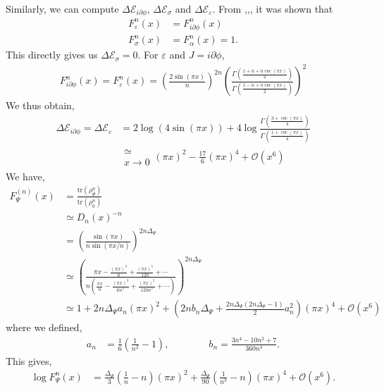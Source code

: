 \documentclass[11pt]{article}
\newcommand{\p}{\partial}
\newcommand{\mO}{\mathcal{O}}
\newcommand{\lb}{\left(}
\newcommand{\rb}{\right)}
\begin{document}
Similarly, we can compute $\Delta \mathcal{E}_{i\p\phi}$, $\Delta \mathcal{E}_{\sigma}$ and $\Delta\mathcal{E}_\varepsilon$. From \cite{Calabrese_2014},\cite{Essler_2013},\cite{Nakagawa_2017}, it was shown that 
\begin{align}
    F_\varepsilon^n(x) &= F_{i\p\phi}^n(x) \\
    F_\sigma^n(x) &= F_\alpha^n(x) = 1.
\end{align}
This directly gives us $\Delta \mathcal{E}_\sigma = 0$. 
For $\varepsilon$ and $J = i\p\phi$, 
\begin{align}
    F_{i\p\phi}^n(x) = F_\varepsilon^n(x) = \lb\frac{2\sin(\pi x)}{n}\rb^{2n} \lb\frac{\Gamma\lb\frac{1+n+n\csc(\pi x)}{2}\rb}{\Gamma\lb\frac{1-n+n\csc(\pi x)}{2}\rb}\rb^2
\end{align}
We thus obtain,
\begin{align}
    \Delta \mathcal{E}_{i\p\phi}= \Delta \mathcal{E}_{\varepsilon} &= 2\log \lb4\sin(\pi x)\rb +4\log \frac{\Gamma\lb\frac{3+\csc(\pi x)}{4}\rb}{\Gamma\lb\frac{1+\csc(\pi x)}{4}\rb} \\
    &\substack{\simeq \\x\to 0} (\pi x)^2 - \frac{17}{6}(\pi x)^4 + \mO(x^6)
\end{align}
We have,
\begin{align}
    F^{(n)}_\Psi(x) &= \frac{\text{tr}(\rho_\Psi^n)}{\text{tr}(\rho_0^n)} \\
    &\simeq D_n(x)^{-n} \\
    &= \lb\frac{\sin(\pi x)}{n\sin(\pi x/n)}\rb^{2n\Delta_\Psi} \\
    &\simeq \lb\frac{\pi x -\frac{(\pi x)^3}{6} + \frac{(\pi x)^5}{120}+\cdots } {n \lb \frac{\pi x }{n} - \frac{(\pi x)^3}{6n^3} +\frac{(\pi x)^5}{120n^5}+ \cdots\rb  }\rb^{2n\Delta_\Psi}\\
    &\simeq 1+ 2n\Delta_\Psi a_n (\pi x)^2 + \lb2n b_n \Delta_\Psi + \frac{2n\Delta_\Psi \lb2n\Delta_\Psi - 1\rb}{2}a_n^2\rb (\pi x)^4+\mO(x^6)
\end{align}
where we defined,
\begin{align}
    a_n&= \frac{1}{6}\lb\frac{1}{n^2}-1\rb, \qquad\qquad 
    b_n= \frac{3n^4 -10n^2 +7}{360n^4}.
\end{align}
This gives,
\begin{align}
    \log F_\Psi^n(x) &= \frac{\Delta_\Psi}{3}\lb\frac{1}{n}-n\rb(\pi x)^2 + \frac{\Delta_\Psi}{90}\lb\frac{1}{n^3}-n\rb(\pi x)^4 + \mO(x^6).
\end{align}
\end{document}
